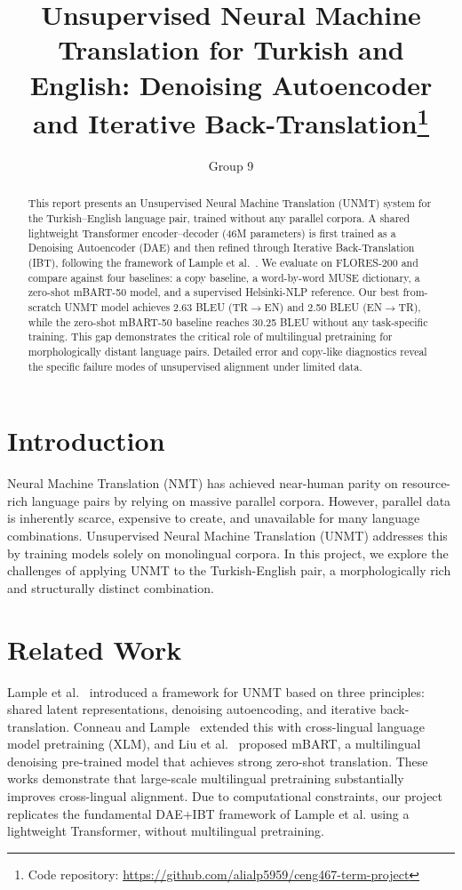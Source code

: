 \documentclass[runningheads]{llncs}
\begin{document}
\title{Unsupervised Neural Machine Translation for Turkish and English: Denoising Autoencoder and Iterative Back-Translation\thanks{Code repository: \url{https://github.com/alialp5959/ceng467-term-project}}}
\author{Group 9}
\maketitle

\begin{abstract}
This report presents an Unsupervised Neural Machine Translation (UNMT) system for the Turkish--English language pair, trained without any parallel corpora. A shared lightweight Transformer encoder--decoder (46M parameters) is first trained as a Denoising Autoencoder (DAE) and then refined through Iterative Back-Translation (IBT), following the framework of Lample et al.~\cite{lample2018phrase}. We evaluate on FLORES-200 and compare against four baselines: a copy baseline, a word-by-word MUSE dictionary, a zero-shot mBART-50 model, and a supervised Helsinki-NLP reference. Our best from-scratch UNMT model achieves 2.63 BLEU (TR$\rightarrow$EN) and 2.50 BLEU (EN$\rightarrow$TR), while the zero-shot mBART-50 baseline reaches 30.25 BLEU without any task-specific training. This gap demonstrates the critical role of multilingual pretraining for morphologically distant language pairs. Detailed error and copy-like diagnostics reveal the specific failure modes of unsupervised alignment under limited data.
\end{abstract}

\section{Introduction}
Neural Machine Translation (NMT) has achieved near-human parity on resource-rich language pairs by relying on massive parallel corpora. However, parallel data is inherently scarce, expensive to create, and unavailable for many language combinations. Unsupervised Neural Machine Translation (UNMT) addresses this by training models solely on monolingual corpora. In this project, we explore the challenges of applying UNMT to the Turkish-English pair, a morphologically rich and structurally distinct combination.

\section{Related Work}
Lample et al.~\cite{lample2018phrase} introduced a framework for UNMT based on three principles: shared latent representations, denoising autoencoding, and iterative back-translation. Conneau and Lample~\cite{conneau2019cross} extended this with cross-lingual language model pretraining (XLM), and Liu et al.~\cite{liu2020multilingual} proposed mBART, a multilingual denoising pre-trained model that achieves strong zero-shot translation. These works demonstrate that large-scale multilingual pretraining substantially improves cross-lingual alignment. Due to computational constraints, our project replicates the fundamental DAE+IBT framework of Lample et al. using a lightweight Transformer, without multilingual pretraining.
\end{document}
